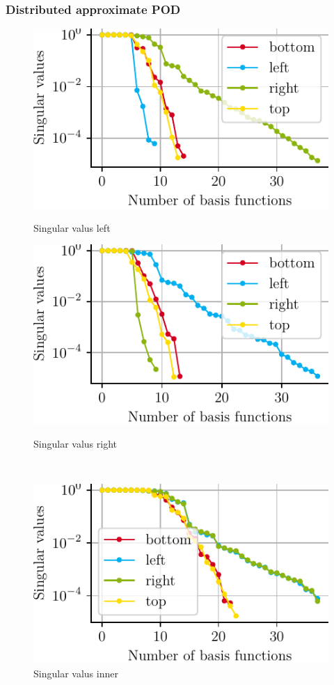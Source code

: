 \documentclass[a4paper]{eccomas_paper-2024}
\begin{document}
\subsubsection{Distributed approximate POD}

\begin{figure}[!htb]
  \includegraphics[]{./figures/beam/fig_loc_svals_left.pdf}
  \caption{Singular valus left}\label{fig:loc_svals_left}
\endminipage\hfill
{}
  \includegraphics[]{./figures/beam/fig_loc_svals_right.pdf}
  \caption{Singular valus right}\label{fig:loc_svals_right}
\endminipage\hfill\\%
\begin{center}
  \includegraphics[]{./figures/beam/fig_loc_svals_inner.pdf}
  \caption{Singular valus inner}\label{fig:loc_svals_inner}
\endminipage
\end{center}
\end{figure}
\end{document}
